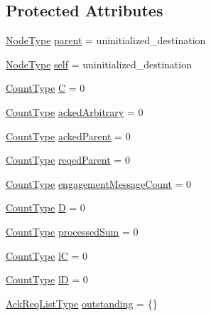 \subsection*{Protected Attributes}
\begin{DoxyCompactItemize}
\item 
\hyperlink{namespacevt_a866da9d0efc19c0a1ce79e9e492f47e2}{Node\+Type} \hyperlink{structvt_1_1term_1_1ds_1_1_term_d_s_a904c12ccc672c4849af1cc6e89a91c54}{parent} = uninitialized\+\_\+destination
\item 
\hyperlink{namespacevt_a866da9d0efc19c0a1ce79e9e492f47e2}{Node\+Type} \hyperlink{structvt_1_1term_1_1ds_1_1_term_d_s_adadcd6e130836bc8d8a6819797f6900b}{self} = uninitialized\+\_\+destination
\item 
\hyperlink{structvt_1_1term_1_1ds_1_1_term_d_s_a54f4ebd7e1ecb59c32c0f5b03ef9f20b}{Count\+Type} \hyperlink{structvt_1_1term_1_1ds_1_1_term_d_s_a5d909caa14a0da42d9809d83e0f79f40}{C} = 0
\item 
\hyperlink{structvt_1_1term_1_1ds_1_1_term_d_s_a54f4ebd7e1ecb59c32c0f5b03ef9f20b}{Count\+Type} \hyperlink{structvt_1_1term_1_1ds_1_1_term_d_s_a3d2853955fae8dbf0180704c67e6eec2}{acked\+Arbitrary} = 0
\item 
\hyperlink{structvt_1_1term_1_1ds_1_1_term_d_s_a54f4ebd7e1ecb59c32c0f5b03ef9f20b}{Count\+Type} \hyperlink{structvt_1_1term_1_1ds_1_1_term_d_s_a694ea9720fa7137d823a58b55250119f}{acked\+Parent} = 0
\item 
\hyperlink{structvt_1_1term_1_1ds_1_1_term_d_s_a54f4ebd7e1ecb59c32c0f5b03ef9f20b}{Count\+Type} \hyperlink{structvt_1_1term_1_1ds_1_1_term_d_s_af2aced5d22eef80e3e4d1cf761f52693}{reqed\+Parent} = 0
\item 
\hyperlink{structvt_1_1term_1_1ds_1_1_term_d_s_a54f4ebd7e1ecb59c32c0f5b03ef9f20b}{Count\+Type} \hyperlink{structvt_1_1term_1_1ds_1_1_term_d_s_ad8d11aea5b48de393ba6f94c0ce8ed7e}{engagement\+Message\+Count} = 0
\item 
\hyperlink{structvt_1_1term_1_1ds_1_1_term_d_s_a54f4ebd7e1ecb59c32c0f5b03ef9f20b}{Count\+Type} \hyperlink{structvt_1_1term_1_1ds_1_1_term_d_s_afcfe54a5e5844f7483cd730c9970fe36}{D} = 0
\item 
\hyperlink{structvt_1_1term_1_1ds_1_1_term_d_s_a54f4ebd7e1ecb59c32c0f5b03ef9f20b}{Count\+Type} \hyperlink{structvt_1_1term_1_1ds_1_1_term_d_s_ad82335b84b7ac759e94fa524c59b03d9}{processed\+Sum} = 0
\item 
\hyperlink{structvt_1_1term_1_1ds_1_1_term_d_s_a54f4ebd7e1ecb59c32c0f5b03ef9f20b}{Count\+Type} \hyperlink{structvt_1_1term_1_1ds_1_1_term_d_s_a7b24d9eb35f71de23824ea8434a52cfd}{lC} = 0
\item 
\hyperlink{structvt_1_1term_1_1ds_1_1_term_d_s_a54f4ebd7e1ecb59c32c0f5b03ef9f20b}{Count\+Type} \hyperlink{structvt_1_1term_1_1ds_1_1_term_d_s_acd01a2b3778d0510fe35f6497f33eda9}{lD} = 0
\item 
\hyperlink{structvt_1_1term_1_1ds_1_1_term_d_s_a9d4102aa0577c3b077befc48c1a88842}{Ack\+Req\+List\+Type} \hyperlink{structvt_1_1term_1_1ds_1_1_term_d_s_a345a64aa827f72e541f9725f7ea2cbf8}{outstanding} = \{\}
\end{DoxyCompactItemize}


